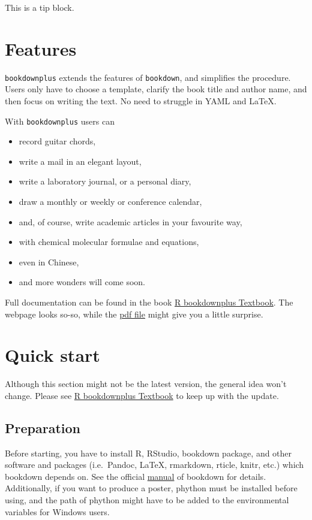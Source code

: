\documentclass[]{book}
\theoremstyle{definition}
\theoremstyle{definition}
\theoremstyle{definition}
\theoremstyle{remark}
\let\BeginKnitrBlock\begin \let\EndKnitrBlock\end
\begin{document}
\BeginKnitrBlock{rmdtip}
This is a tip block.
\EndKnitrBlock{rmdtip}

\section{Features}\label{features}

\texttt{bookdownplus} extends the features of \texttt{bookdown}, and
simplifies the procedure. Users only have to choose a template, clarify
the book title and author name, and then focus on writing the text. No
need to struggle in YAML and LaTeX.

With \texttt{bookdownplus} users can

\begin{itemize}
\item
  record guitar chords,
\item
  write a mail in an elegant layout,
\item
  write a laboratory journal, or a personal diary,
\item
  draw a monthly or weekly or conference calendar,
\item
  and, of course, write academic articles in your favourite way,
\item
  with chemical molecular formulae and equations,
\item
  even in Chinese,
\item
  and more wonders will come soon.
\end{itemize}

Full documentation can be found in the book
\href{https://bookdown.org/baydap/bookdownplus}{R bookdownplus
Textbook}. The webpage looks so-so, while the
\href{https://bookdown.org/baydap/bookdownplus/bookdownplus.pdf}{pdf
file} might give you a little surprise.

\section{Quick start}\label{quick-start}

Although this section might not be the latest version, the general idea
won't change. Please see
\href{https://bookdown.org/baydap/bookdownplus}{R bookdownplus Textbook}
to keep up with the update.

\subsection{Preparation}\label{preparation}

Before starting, you have to install R, RStudio, bookdown package, and
other software and packages (i.e.~Pandoc, LaTeX, rmarkdown, rticle,
knitr, etc.) which bookdown depends on. See the official
\href{https://bookdown.org/yihui/bookdown/}{manual} of bookdown for
details. Additionally, if you want to produce a poster, phython must be
installed before using, and the path of phython might have to be added
to the environmental variables for Windows users.
\end{document}
